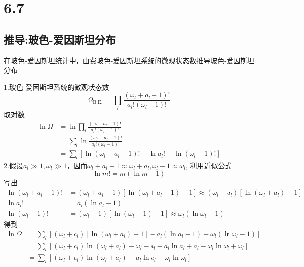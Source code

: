 \section{6.7}


\newpage
\subsection{推导:玻色-爱因斯坦分布}
在玻色-爱因斯坦统计中，由费玻色-爱因斯坦系统的微观状态数推导玻色-爱因斯坦分布

1.玻色-爱因斯坦系统的微观状态数
\begin{equation}
    \Omega _{\mathrm{B}.\mathrm{E}.}=\prod_l{\frac{\left( \omega _l+a_l-1 \right) !}{a_l!\left( \omega _l-1 \right) !}}
\end{equation}
取对数
\begin{equation}
    \begin{aligned}
        \ln \Omega &=\ln \prod_l{\frac{\left( \omega _l+a_l-1 \right) !}{a_l!\left( \omega _l-1 \right) !}}
\\
&=\sum_l{\ln \frac{\left( \omega _l+a_l-1 \right) !}{a_l!\left( \omega _l-1 \right) !}}
\\
&=\sum_l{\left[ \ln \left( \omega _l+a_l-1 \right) !-\ln a_l!-\ln \left( \omega _l-1 \right) ! \right]}
    \end{aligned}
\end{equation}
2.假设$a_l\gg 1,\omega _l\gg 1$，因而$\omega _l+a_l-1\approx \omega _l+a_l,\omega _l-1\approx \omega _l$,
利用近似公式
\begin{equation}
    \ln m!=m\left( \ln m-1 \right) 
\end{equation}
写出
\begin{equation}
    \begin{aligned}
        \ln \left( \omega _l+a_l-1 \right) !&=\left( \omega _l+a_l-1 \right) \left[ \ln \left( \omega _l+a_l-1 \right) -1 \right] \approx \left( \omega _l+a_l \right) \left[ \ln \left( \omega _l+a_l \right) -1 \right] 
\\
\ln a_l!&=a_l\left( \ln a_l-1 \right) 
\\
\ln \left( \omega _l-1 \right) !&=\left( \omega _l-1 \right) \left[ \ln \left( \omega _l-1 \right) -1 \right] \approx \omega _l\left( \ln \omega _l-1 \right) 
    \end{aligned}
\end{equation}
得到
\begin{equation}
    \begin{aligned}
        \ln \Omega &=\sum_l{\left[ \left( \omega _l+a_l \right) \left[ \ln \left( \omega _l+a_l \right) -1 \right] -a_l\left( \ln a_l-1 \right) -\omega _l\left( \ln \omega _l-1 \right) \right]}
\\
&=\sum_l{\left[ \left( \omega _l+a_l \right) \ln \left( \omega _l+a_l \right) -\omega _l-a_l-a_l\ln a_l+a_l-\omega _l\ln \omega _l+\omega _l \right]}
\\
&=\sum_l{\left[ \left( \omega _l+a_l \right) \ln \left( \omega _l+a_l \right) -a_l\ln a_l-\omega _l\ln \omega _l \right]}
    \end{aligned}
\end{equation}
